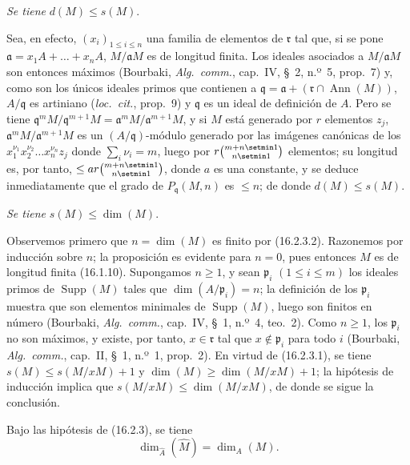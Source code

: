 \begin{env}[16.2.3.3]
\label{0.16.2.3.3-fr}
\emph{Se tiene} $d(M)\leq s(M)$.
\end{env}

Sea, en efecto, $(x_i)_{1\leq i\leq n}$ una familia de elementos de
$\mathfrak{r}$ tal que, si se pone
$\mathfrak{a}=x_1A+\ldots+x_nA$, $M/\mathfrak{a}M$ es de longitud finita.
Los ideales asociados a $M/\mathfrak{a}M$ son entonces máximos (Bourbaki,
\emph{Alg.~comm.}, cap.~IV, \S~2, n.º~5, prop.~7) y, como son los únicos
ideales primos que contienen a
$\mathfrak{q}=\mathfrak{a}+(\mathfrak{r}\cap\operatorname{Ann}(M))$,
$A/\mathfrak{q}$ es artiniano (\emph{loc.~cit.}, prop.~9) y $\mathfrak{q}$ es
un ideal de definición de $A$. Pero se tiene
$\mathfrak{q}^mM/\mathfrak{q}^{m+1}M=
\mathfrak{a}^mM/\mathfrak{a}^{m+1}M$, y si $M$ está generado por $r$ elementos
$z_j$, $\mathfrak{a}^mM/\mathfrak{a}^{m+1}M$ es un
$(A/\mathfrak{q})$-módulo generado por las imágenes canónicas de los
$x_1^{\nu_1}x_2^{\nu_2}\ldots x_n^{\nu_n}z_j$ donde
$\sum_i\nu_i=m$, luego por $r\binom{m+n\setmin 1}{n\setmin 1}$ elementos; su longitud es,
por tanto, $\leq ar\binom{m+n\setmin 1}{n\setmin 1}$, donde $a$ es una constante, y se
deduce inmediatamente que el grado de $P_{\mathfrak{q}}(M,n)$ es $\leq n$;
de donde $d(M)\leq s(M)$.

\begin{env}[16.2.3.4]
\label{0.16.2.3.4-fr}
\emph{Se tiene} $s(M)\leq\dim(M)$.
\end{env}

Observemos primero que $n=\dim(M)$ es finito por (16.2.3.2). Razonemos por
inducción sobre $n$; la proposición es evidente para $n=0$, pues entonces $M$
es de longitud finita (16.1.10). Supongamos $n\geq1$, y sean
$\mathfrak{p}_i$ $(1\leq i\leq m)$ los ideales primos de
$\operatorname{Supp}(M)$ tales que $\dim(A/\mathfrak{p}_i)=n$; la definición
de los $\mathfrak{p}_i$ muestra que son elementos minimales de
$\operatorname{Supp}(M)$, luego son finitos en número (Bourbaki,
\emph{Alg.~comm.}, cap.~IV, \S~1, n.º~4, teo.~2). Como $n\geq1$, los
$\mathfrak{p}_i$ no son máximos, y existe, por tanto,
$x\in\mathfrak{r}$ tal que $x\notin\mathfrak{p}_i$ para todo $i$ (Bourbaki,
\emph{Alg.~comm.}, cap.~II, \S~1, n.º~1, prop.~2). En virtud de (16.2.3.1),
se tiene $s(M)\leq s(M/xM)+1$ y $\dim(M)\geq\dim(M/xM)+1$; la hipótesis de
inducción implica que $s(M/xM)\leq\dim(M/xM)$, de donde se sigue la conclusión.

\begin{corollary}[16.2.4]
\label{0.16.2.4-fr}
Bajo las hipótesis de \textup{(16.2.3)}, se tiene
\begin{equation}
\label{0.16.2.4.1-fr}
\tag{16.2.4.1}
  \dim_{\widehat{A}}(\widehat{M})=\dim_A(M).
\end{equation}
\end{corollary}


